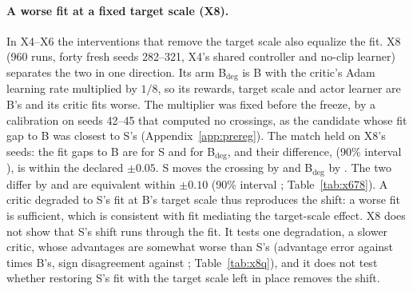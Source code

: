 \paragraph{A worse fit at a fixed target scale (X8).}
In X4--X6 the interventions that remove the target scale also equalize the fit. X8 (960 runs, forty fresh seeds
282--321, X4's shared controller and no-clip learner) separates the two in one direction. Its arm B$_{\mathrm{deg}}$ is
B with the critic's Adam learning rate multiplied by $1/8$, so its rewards, target scale and actor learner are B's and its critic
fits worse. The multiplier was fixed before the freeze, by a calibration on seeds 42--45 that computed no crossings,
as the candidate whose fit gap to B was closest to S's (Appendix~\ref{app:prereg}). The match held on X8's seeds: the
fit gaps to B are \VxeiFit{} for S and \VxeiDegFit{} for B$_{\mathrm{deg}}$, and their difference, \VxeiFitDiff{}
(90\% interval \VxeiFitDiffNinety{}), is within the declared $\pm0.05$. S moves the crossing by \VxeiPlain{} and
B$_{\mathrm{deg}}$ by \VxeiDeg{}. The two differ by \VxeiDiff{} and are equivalent within $\pm0.10$ (90\% interval
\VxeiDiffNinety{}; Table~\ref{tab:x678}). A critic degraded to S's fit at B's target scale thus reproduces the shift:
a worse fit is sufficient, which is consistent with fit mediating the target-scale effect. X8 does not show that S's
shift runs through the fit. It tests one degradation, a slower critic, whose advantages are somewhat worse than S's
(advantage error \VxeiDegGae{} against \VxeiGae{} times B's, sign disagreement \VxeiDegSign{} against \VxeiSign{};
Table~\ref{tab:x8q}), and it does not test whether restoring S's fit with the target scale left in place removes the
shift.

